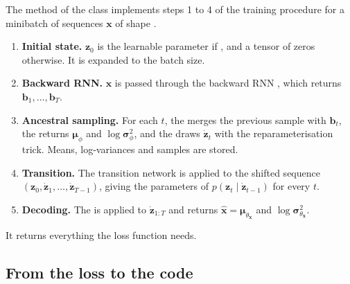 The  method of the  class implements steps 1 to
4 of the training procedure for a minibatch of sequences
$\mathbf{x}$ of shape .
\begin{enumerate}
    \item \textbf{Initial state.} $\mathbf{z}_0$ is the learnable
    parameter  if , and a tensor
    of zeros otherwise. It is expanded to the batch size.
    \item \textbf{Backward RNN.} $\mathbf{x}$ is passed through the
    backward RNN , which returns
    $\mathbf{b}_1, \dots, \mathbf{b}_T$.
    \item \textbf{Ancestral sampling.} For each $t$, the 
    merges the previous sample with $\mathbf{b}_t$, the 
    returns $\boldsymbol{\mu}_{\phi}$ and $\log\boldsymbol{\sigma}^2_{\phi}$,
    and the  draws $\dot{\mathbf{z}}_t$ with the
    reparameterisation trick. Means, log-variances and samples are
    stored.
    \item \textbf{Transition.} The transition network  is
    applied to the shifted sequence
    $(\mathbf{z}_0, \dot{\mathbf{z}}_1, \dots, \dot{\mathbf{z}}_{T-1})$,
    giving the parameters of $p(\mathbf{z}_t \mid
    \dot{\mathbf{z}}_{t-1})$ for every $t$.
    \item \textbf{Decoding.} The  is applied to
    $\dot{\mathbf{z}}_{1:T}$ and returns
    $\hat{\mathbf{x}} = \boldsymbol{\mu}_{\theta_{\mathbf{x}}}$ and
    $\log\boldsymbol{\sigma}^2_{\theta_{\mathbf{x}}}$.
\end{enumerate}
It returns everything the loss function needs.

\subsection{From the loss to the code}\label{sec:loss_code}

